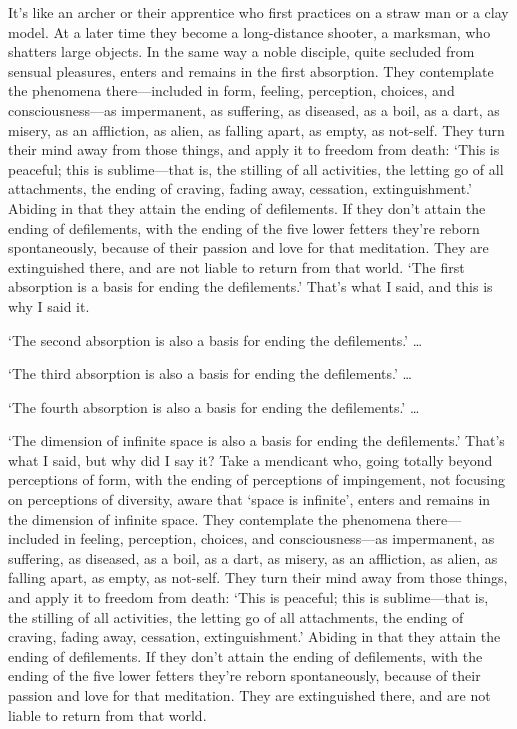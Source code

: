 \documentclass[12pt,openany]{book}%
\begin{document}
It’s like an archer or their apprentice who first practices on a straw man or a clay model. At a later time they become a long-distance shooter, a marksman, who shatters large objects. In the same way a noble disciple, quite secluded from sensual pleasures, enters and remains in the first absorption. They contemplate the phenomena there—included in form, feeling, perception, choices, and consciousness—as impermanent, as suffering, as diseased, as a boil, as a dart, as misery, as an affliction, as alien, as falling apart, as empty, as not-self. They turn their mind away from those things, and apply it to freedom from death: ‘This is peaceful; this is sublime—that is, the stilling of all activities, the letting go of all attachments, the ending of craving, fading away, cessation, extinguishment.’ Abiding in that they attain the ending of defilements. If they don’t attain the ending of defilements, with the ending of the five lower fetters they’re reborn spontaneously, because of their passion and love for that meditation. They are extinguished there, and are not liable to return from that world. ‘The first absorption is a basis for ending the defilements.’ That’s what I said, and this is why I said it. 

‘The second absorption is also a basis for ending the defilements.’ … 

‘The third absorption is also a basis for ending the defilements.’ … 

‘The fourth absorption is also a basis for ending the defilements.’ … 

‘The dimension of infinite space is also a basis for ending the defilements.’ That’s what I said, but why did I say it? Take a mendicant who, going totally beyond perceptions of form, with the ending of perceptions of impingement, not focusing on perceptions of diversity, aware that ‘space is infinite’, enters and remains in the dimension of infinite space. They contemplate the phenomena there—included in feeling, perception, choices, and consciousness—as impermanent, as suffering, as diseased, as a boil, as a dart, as misery, as an affliction, as alien, as falling apart, as empty, as not-self. They turn their mind away from those things, and apply it to freedom from death: ‘This is peaceful; this is sublime—that is, the stilling of all activities, the letting go of all attachments, the ending of craving, fading away, cessation, extinguishment.’ Abiding in that they attain the ending of defilements. If they don’t attain the ending of defilements, with the ending of the five lower fetters they’re reborn spontaneously, because of their passion and love for that meditation. They are extinguished there, and are not liable to return from that world. 
\end{document}
